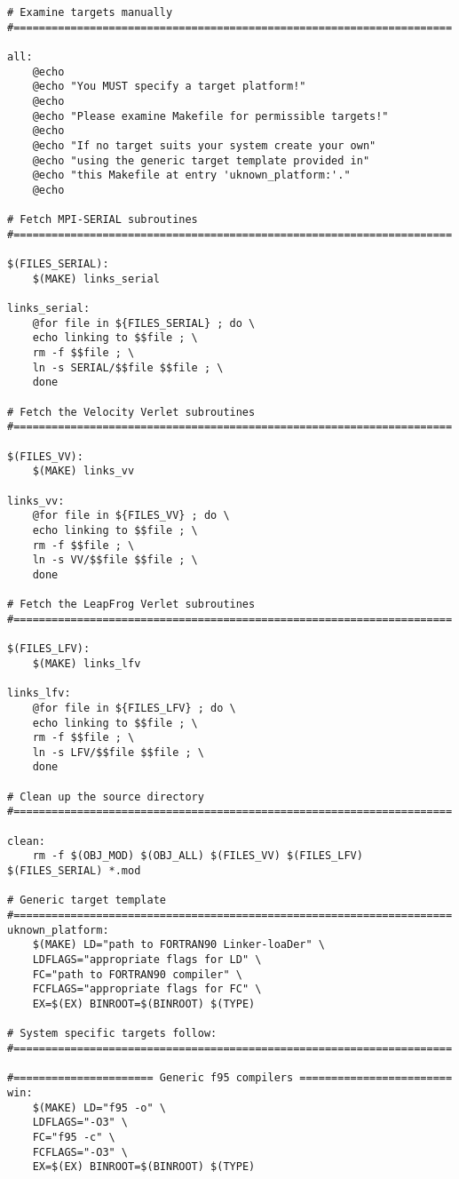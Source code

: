 \begin{verbatim}
# Examine targets manually
#=====================================================================

all:
	@echo
	@echo "You MUST specify a target platform!"
	@echo
	@echo "Please examine Makefile for permissible targets!"
	@echo
	@echo "If no target suits your system create your own"
	@echo "using the generic target template provided in"
	@echo "this Makefile at entry 'uknown_platform:'."
	@echo

# Fetch MPI-SERIAL subroutines
#=====================================================================

$(FILES_SERIAL):
	$(MAKE) links_serial

links_serial:
	@for file in ${FILES_SERIAL} ; do \
	echo linking to $$file ; \
	rm -f $$file ; \
	ln -s SERIAL/$$file $$file ; \
	done

# Fetch the Velocity Verlet subroutines
#=====================================================================

$(FILES_VV):
	$(MAKE) links_vv

links_vv:
	@for file in ${FILES_VV} ; do \
	echo linking to $$file ; \
	rm -f $$file ; \
	ln -s VV/$$file $$file ; \
	done

# Fetch the LeapFrog Verlet subroutines
#=====================================================================

$(FILES_LFV):
	$(MAKE) links_lfv

links_lfv:
	@for file in ${FILES_LFV} ; do \
	echo linking to $$file ; \
	rm -f $$file ; \
	ln -s LFV/$$file $$file ; \
	done

# Clean up the source directory
#=====================================================================

clean:
	rm -f $(OBJ_MOD) $(OBJ_ALL) $(FILES_VV) $(FILES_LFV) $(FILES_SERIAL) *.mod

# Generic target template
#=====================================================================
uknown_platform:
	$(MAKE) LD="path to FORTRAN90 Linker-loaDer" \
	LDFLAGS="appropriate flags for LD" \
	FC="path to FORTRAN90 compiler" \
	FCFLAGS="appropriate flags for FC" \
	EX=$(EX) BINROOT=$(BINROOT) $(TYPE)

# System specific targets follow:
#=====================================================================

#====================== Generic f95 compilers ========================
win:
	$(MAKE) LD="f95 -o" \
	LDFLAGS="-O3" \
	FC="f95 -c" \
	FCFLAGS="-O3" \
	EX=$(EX) BINROOT=$(BINROOT) $(TYPE)


\end{verbatim}
